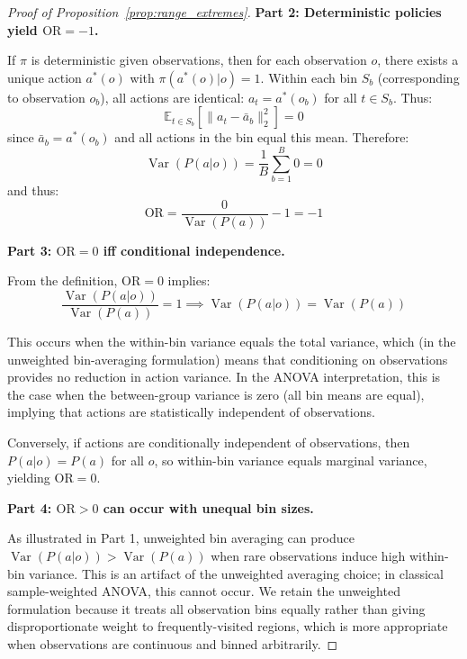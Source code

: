 \documentclass[twoside]{article}
\DeclareMathOperator{\Var}{Var}
\theoremstyle{remark}
\begin{document}
\begin{proof}[Proof of Proposition~\ref{prop:range_extremes}]
\textbf{Part 2: Deterministic policies yield $\mathrm{OR} = -1$.}

If $\pi$ is deterministic given observations, then for each observation $o$, there exists a unique action $a^*(o)$ with $\pi(a^*(o)|o) = 1$. Within each bin $S_b$ (corresponding to observation $o_b$), all actions are identical: $a_t = a^*(o_b)$ for all $t \in S_b$. Thus:
\begin{equation}
\mathbb{E}_{t \in S_b}[\|a_t - \bar{a}_b\|_2^2] = 0
\end{equation}
since $\bar{a}_b = a^*(o_b)$ and all actions in the bin equal this mean. Therefore:
\begin{equation}
\Var(P(a|o)) = \frac{1}{B} \sum_{b=1}^{B} 0 = 0
\end{equation}
and thus:
\begin{equation}
\mathrm{OR} = \frac{0}{\Var(P(a))} - 1 = -1
\end{equation}

\textbf{Part 3: $\mathrm{OR} = 0$ iff conditional independence.}

From the definition, $\mathrm{OR} = 0$ implies:
\begin{equation}
\frac{\Var(P(a|o))}{\Var(P(a))} = 1 \implies \Var(P(a|o)) = \Var(P(a))
\end{equation}

This occurs when the within-bin variance equals the total variance, which (in the unweighted bin-averaging formulation) means that conditioning on observations provides no reduction in action variance. In the ANOVA interpretation, this is the case when the between-group variance is zero (all bin means are equal), implying that actions are statistically independent of observations.

Conversely, if actions are conditionally independent of observations, then $P(a|o) = P(a)$ for all $o$, so within-bin variance equals marginal variance, yielding $\mathrm{OR} = 0$.

\textbf{Part 4: $\mathrm{OR} > 0$ can occur with unequal bin sizes.}

As illustrated in Part 1, unweighted bin averaging can produce $\Var(P(a|o)) > \Var(P(a))$ when rare observations induce high within-bin variance. This is an artifact of the unweighted averaging choice; in classical sample-weighted ANOVA, this cannot occur. We retain the unweighted formulation because it treats all observation bins equally rather than giving disproportionate weight to frequently-visited regions, which is more appropriate when observations are continuous and binned arbitrarily.
\end{proof}
\end{document}
